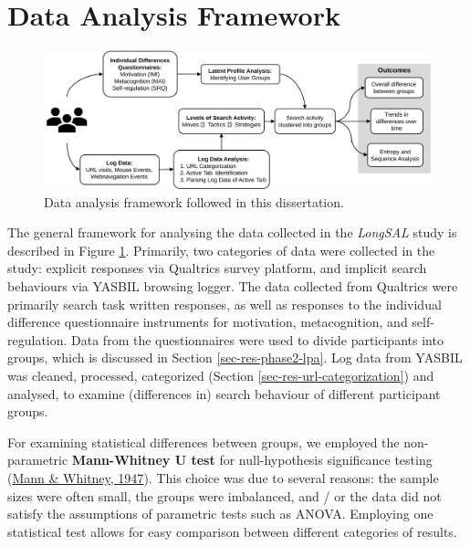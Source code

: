 \documentclass[letterpaper, nobind]{templates/ociamthesis}
\begin{document}
\hypertarget{data-analysis-framework}{%
\section{Data Analysis Framework}\label{data-analysis-framework}}

\begin{figure}

{\centering \includegraphics[width=1\linewidth]{figs/data-analysis-framework} 

}

\caption[Data analysis framework.]{Data analysis framework followed in this dissertation.}\label{fig:data-analysis-framework}
\end{figure}





The general framework for analysing the data collected in the \emph{LongSAL} study is described in Figure \ref{fig:data-analysis-framework}.
Primarily, two categories of data were collected in the study:
explicit responses via Qualtrics survey platform, and implicit search behaviours via YASBIL browsing logger.
The data collected from Qualtrics were primarily search task written responses, as well as responses to the individual difference questionnaire instruments for motivation, metacognition, and self-regulation.
Data from the questionnaires were used to divide participants into groups, which is discussed in Section \ref{sec-res-phase2-lpa}.
Log data from YASBIL was cleaned, processed, categorized (Section \ref{sec-res-url-categorization}) and analysed, to examine (differences in) search behaviour of different participant groups.

For examining statistical differences between groups, we employed the non-parametric \textbf{Mann-Whitney U test} for null-hypothesis significance testing (\protect\hyperlink{ref-mann1947test}{Mann \& Whitney, 1947}).
This choice was due to several reasons:
the sample sizes were often small,
the groups were imbalanced, and / or the data did not satisfy the assumptions of parametric tests such as ANOVA.
Employing one statistical test allows for easy comparison between different categories of results.
\end{document}

